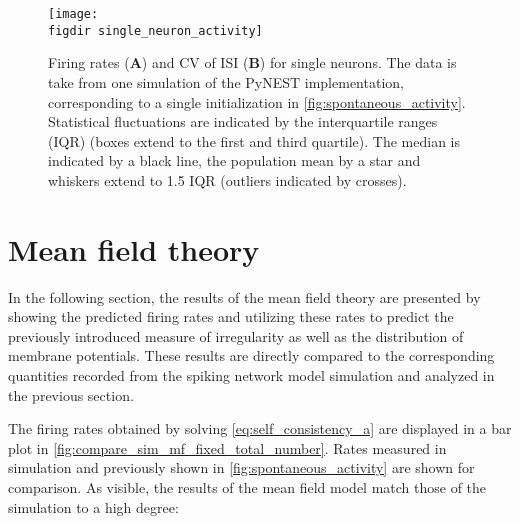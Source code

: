 \begin{figure}[tb]
    \centering
    \texttt{[image: \\figdir single\_neuron\_activity]}
    \caption[Firing rates and CV of ISI of single neurons]{
        Firing rates (\textbf{A}) and CV of ISI (\textbf{B}) for single neurons. 
        The data is take from one simulation of the PyNEST implementation, 
        corresponding to a single initialization in \autoref{fig:spontaneous_activity}.
        Statistical fluctuations 
        are indicated by the interquartile ranges (IQR) (boxes extend to 
        the first and third quartile). 
        The median is indicated by a black line, the population mean by a star and 
        whiskers extend to 1.5 IQR (outliers indicated by crosses). 
    }
    \label{fig:single_neuron_activity}
\end{figure}

\section{Mean field theory}
In the following section, the results of the mean field theory are presented 
by showing the predicted firing rates and utilizing these rates 
to predict the previously introduced measure of irregularity
as well as the distribution of membrane potentials. 
These results are directly compared to 
the corresponding quantities recorded from the spiking network 
model simulation and analyzed in the previous section. 

The firing rates obtained by solving 
\autoref{eq:self_consistency_a} are displayed in a bar plot in 
\autoref{fig:compare_sim_mf_fixed_total_number}. Rates measured in 
simulation and previously shown in \autoref{fig:spontaneous_activity}
are shown for comparison. As visible, the results of the mean field model 
match those of the simulation to a high degree:

